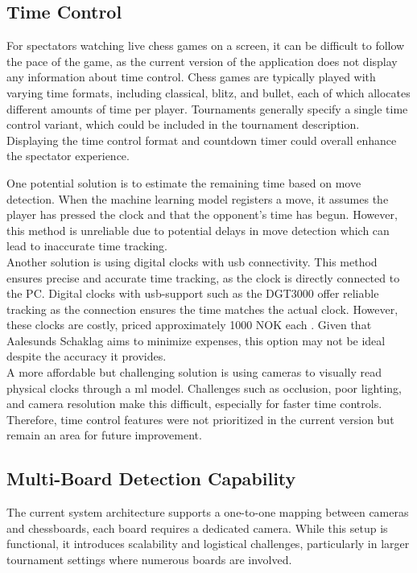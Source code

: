 \subsection{Time Control}
For spectators watching live chess games on a screen, it can be difficult to follow the pace of the game, as the current version of the application does not display any information about time control. Chess games are typically played with varying time formats, including \gls{classical}, \gls{blitz}, and \gls{bullet}, each of which allocates different amounts of time per player. Tournaments generally specify a single time control variant, which could be included in the tournament description. Displaying the time control format and countdown timer could overall enhance the spectator experience. \\

\newpage

One potential solution is to estimate the remaining time based on move detection. When the machine learning model registers a move, it assumes the player has pressed the clock and that the opponent’s time has begun. However, this method is unreliable due to potential delays in move detection which can lead to inaccurate time tracking. \\

Another solution is using digital clocks with \gls{usb} connectivity. This method ensures precise and accurate time tracking, as the clock is directly connected to the PC. Digital clocks with \gls{usb}-support such as the DGT3000 offer reliable tracking as the connection ensures the time matches the actual clock. However, these clocks are costly, priced approximately 1000 NOK each \cite{sjakkbutikken:dgt-clock}. Given that Aalesunds Schaklag aims to minimize expenses, this option may not be ideal despite the accuracy it provides. \\

A more affordable but challenging solution is using cameras to visually read physical clocks through a \gls{ml} model. Challenges such as occlusion, poor lighting, and camera resolution make this difficult, especially for faster time controls. \\

Therefore, time control features were not prioritized in the current version but remain an area for future improvement.

\subsection{Multi-Board Detection Capability}
The current system architecture supports a one-to-one mapping between cameras and chessboards, each board requires a dedicated camera. While this setup is functional, it introduces scalability and logistical challenges, particularly in larger tournament settings where numerous boards are involved. \\

